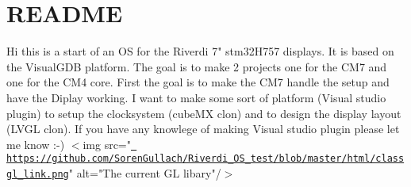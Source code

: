 \chapter{README}
\hypertarget{md__r_e_a_d_m_e}{}\label{md__r_e_a_d_m_e}
Hi this is a start of an OS for the Riverdi 7"{} stm32\+H757 displays.  \+It is based on the Visual\+GDB platform. The goal is to make 2 projects one for the CM7 and one for the CM4 core. First the goal is to make the CM7 handle the setup and have the Diplay working.  \+I want to make some sort of platform (\+Visual studio plugin) to setup the clocksystem (cube\+MX clon) and to design the display layout (\+LVGL clon). If you have any knowlege of making Visual studio plugin please let me know \+:-\/)  $<$img src="{}\href{https://github.com/SorenGullach/Riverdi_OS_test/blob/master/html/classgl_link.png}{\texttt{ https\+://github.\+com/\+Soren\+Gullach/\+Riverdi\+\_\+\+OS\+\_\+test/blob/master/html/classgl\+\_\+link.\+png}}"{} alt="{}The current GL libary"{}/\texorpdfstring{$>$}{>} 
